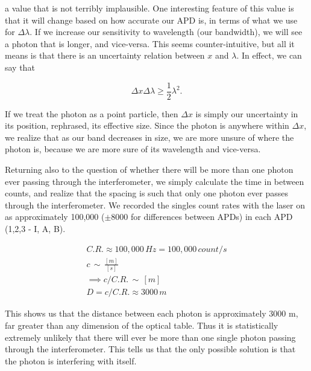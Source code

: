 \documentclass{article}
\begin{document}
a value that is not terribly implausible.  One interesting feature of this value is that it will change based on how accurate our APD is, in terms of what we use for $\Delta \lambda$.  If we increase our sensitivity to wavelength (our bandwidth), we will see a photon that is longer, and vice-versa.  This seems counter-intuitive, but all it means is that there is an uncertainty relation between $x$ and $\lambda$.  In effect, we can say that

\begin{equation}
	\Delta x \Delta \lambda \geq \frac{1}{2} \lambda^2.
\end{equation}

If we treat the photon as a point particle, then $\Delta x$ is simply our uncertainty in its position, rephrased, its effective size.  Since the photon is anywhere within $\Delta x$, we realize that as our band decreases in size, we are more unsure of where the photon is, because we are more sure of its wavelength and vice-versa.

\hspace{.25cm}

Returning also to the question of whether there will be more than one photon ever passing through the interferometer, we simply calculate the time in between counts, and realize that the spacing is such that only one photon ever passes through the interferometer.  We recorded the singles count rates with the laser on as approximately 100,000 ($\pm 8000$ for differences between APDs) in each APD (1,2,3 - I, A, B).

\begin{gather*}
	C.R. \approx 100,000 \, H\!z = 100,000 \, count/s \\
	c \, \sim \, \frac{[m]}{[s]} \\
	\implies c/C.R. \, \sim \, [m] \\
	D = c/C.R. \approx 3000 \, m 
\end{gather*}

This shows us that the distance between each photon is approximately 3000 m, far greater than any dimension of the optical table.  Thus it is statistically extremely unlikely that there will ever be more than one single photon passing through the interferometer.  This tells us that the only possible solution is that the photon is interfering with itself.
\end{document}
